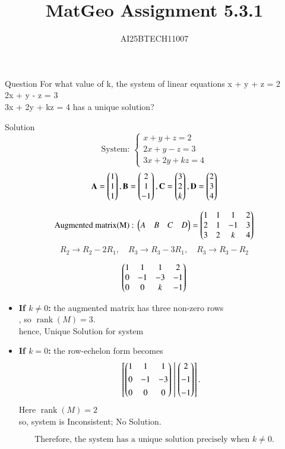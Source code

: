 \documentclass{beamer}
\title 
{MatGeo Assignment 5.3.1}
\author
{AI25BTECH11007}
\begin{document}
\frame{\titlepage}
\begin{frame}{Question}
    For what value of k, the system of linear equations
x + y + z = 2\\
2x + y - z = 3\\
3x + 2y + kz = 4
has a unique solution?
\end{frame}

\begin{frame}{Solution}
    \[
\text{System: }
\begin{cases}
x+y+z = 2 \\
2x+y-z = 3 \\
3x+2y+kz = 4
\end{cases}
\]
\[
\mathbf A = \begin{pmatrix}1\\1\\1\end{pmatrix},
 \mathbf B = \begin{pmatrix}2\\1\\-1\end{pmatrix} ,
\mathbf C = \begin{pmatrix}3\\2\\k\end{pmatrix},
\mathbf D = \begin{pmatrix}2\\3\\4\end{pmatrix}
 \]       

\[
\text{Augmented matrix(M) : }
\begin{pmatrix}A & B & C & D\end{pmatrix} = 
\begin{pmatrix}1 & 1 & 1 & 2 \\ 2 & 1 & -1 & 3 \\ 3 & 2 & k & 4\end{pmatrix}
\]
\[
R_2 \to R_2 - 2R_1,\quad R_3 \to R_3 - 3R_1, \quad R_3 \to R_3 - R_2
\]
\end{frame}

\begin{frame}
\[
\begin{pmatrix}1 & 1 & 1 & 2 \\ 0 & -1 & -3 & -1 \\ 0 & 0 & k & -1\end{pmatrix}
\]


\begin{itemize}
\item \textbf{If \(k\neq0\):} the augmented matrix has three non-zero rows\\, so \(\operatorname{rank}(M)=3\).\\ 
hence, Unique Solution for system
\item \textbf{If \(k=0\):} the row-echelon form becomes
\[
\left[\begin{pmatrix}1 & 1 & 1\\[4pt] 0 & -1 & -3\\[4pt] 0 & 0 & 0\end{pmatrix}\;\middle|\;\begin{pmatrix}2\\[4pt]-1\\[4pt]-1\end{pmatrix}\right].
\]
Here \(\operatorname{rank}(M)=2\)\\
so, system is Inconsistent; No Solution.
\end{itemize}

\[
\boxed{\text{Therefore, the system has a unique solution precisely when }k\neq0.}
\]
\end{frame}
\end{document}
